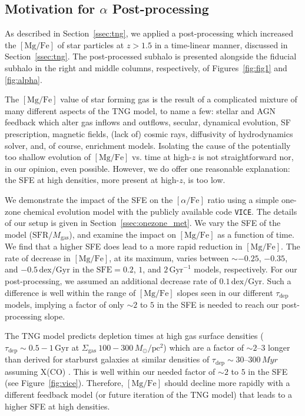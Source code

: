 \documentclass[twocolumn]{aastex631}
\newcommand{\Msun}{\ensuremath{M_{\odot}}}
\newcommand{\Gyr}{\ensuremath{\textrm{Gyr}}}
\newcommand{\pc}{\ensuremath{\textrm{pc}}}
\newcommand{\MgFe}{\ensuremath{[\textrm{Mg}/\textrm{Fe}]}}
\newcommand{\alphaFe}{\ensuremath{[\alpha/\textrm{Fe}]}}
\newcommand{\dex}{\ensuremath{\textrm{dex}}}
\begin{document}
\subsection{Motivation for $\alpha$ Post-processing}\label{ssec:sfe}
As described in Section~\ref{ssec:tng}, we applied a post-processing which increased the \MgFe{} of star particles at $z>1.5$ in a time-linear manner, discussed in Section~\ref{ssec:tng}. The post-processed subhalo is presented alongside the fiducial subhalo in the right and middle columns, respectively, of Figures~\ref{fig:fig1} and \ref{fig:alpha}.

The \MgFe{} value of star forming gas is the result of a complicated mixture of many different aspects of the TNG model, to name a few: stellar and AGN feedback which alter gas inflows and outflows, secular, dynamical evolution, SF prescription, magnetic fields, (lack of) cosmic rays, diffusivity of hydrodynamics solver, and, of course, enrichment models. Isolating the cause of the potentially too shallow evolution of \MgFe{} vs. time at high-$z$ is not straightforward nor, in our opinion, even possible. However, we do offer one reasonable explanation: the SFE at high densities, more present at high-$z$, is too low.

We demonstrate the impact of the SFE on the \alphaFe{} ratio using a simple one-zone chemical evolution model with the publicly available code \texttt{VICE}. The details of our setup is given in Section~\ref{ssec:onezone_met}. We vary the SFE of the model ($\textrm{SFR}/M_{\textrm{gas}}$), and examine the impact on \MgFe{} as a function of time. We find that a higher SFE does lead to a more rapid reduction in \MgFe{}. The rate of decrease in \MgFe{}, at its maximum, varies between $\sim-0.25$, $-0.35$, and $-0.5\,\dex/\Gyr$ in the $\textrm{SFE}=0.2$, $1$, and $2\,\Gyr^{-1}$ models, respectively. For our post-processing, we assumed an additional decrease rate of $0.1\,\dex/\Gyr$. Such a difference is well within the range of \MgFe{} slopes seen in our different $\tau_{\textrm{dep}}$ models, implying a factor of only $\sim2$ to $5$ in the SFE is needed to reach our post-processing slope.

The TNG model predicts depletion times at high gas surface densities ($\tau_{\textrm{dep}}\sim0.5-1\,\Gyr$ at $\Sigma_{\textrm{gas}} ~ 100-300\,\Msun/\pc^2$) which are a factor of $\sim2$--$3$ longer than derived for starburst galaxies at similar densities of $\tau_{\textrm{dep}}\sim30$--$300\,Myr$ assuming \citet{2013ARA&A..51..207B} X(CO) \citep[see][]{2019ApJ...872...16D,2021ApJ...908...61K,2024arXiv240909121H}. This is well within our needed factor of $\sim2$ to $5$ in the SFE (see Figure~\ref{fig:vice}). Therefore, \MgFe{} should decline more rapidly with a different feedback model (or future iteration of the TNG model) that leads to a higher SFE at high densities.
\end{document}
